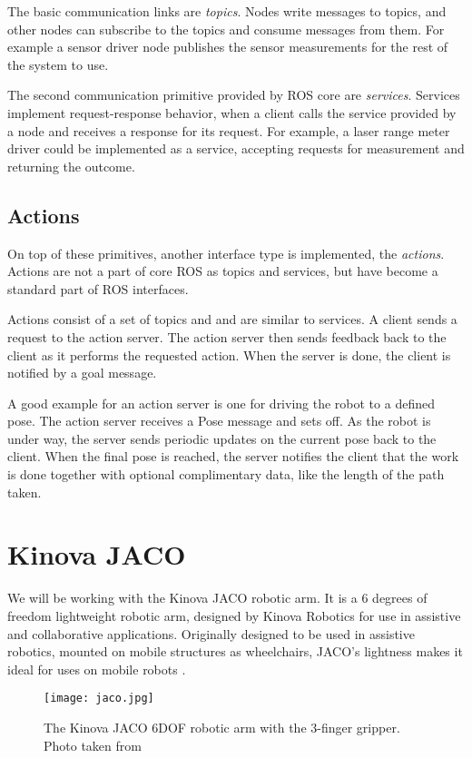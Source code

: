 \documentclass[buriama8_dp.tex]{subfiles}
\begin{document}
The basic communication links are \emph{topics}. Nodes write messages to topics, and other nodes can subscribe to the topics and consume messages from them. For example a sensor driver node publishes the sensor measurements for the rest of the system to use.

The second communication primitive provided by ROS core are \emph{services}. Services implement request-response behavior, when a client calls the service provided by a node and receives a response for its request. For example, a laser range meter driver could be implemented as a service, accepting requests for measurement and returning the outcome.

\subsection{Actions}
\label{subsec:ros_actions}

On top of these primitives, another interface type is implemented, the \emph{actions}. Actions are not a part of core ROS as topics and services, but have become a standard part of ROS interfaces.

Actions consist of a set of topics and and are similar to services. A client sends a request to the action server. The action server then sends feedback back to the client as it performs the requested action. When the server is done, the client is notified by a goal message.

A good example for an action server is one for driving the robot to a defined pose. The action server receives a Pose message and sets off. As the robot is under way, the server sends periodic updates on the current pose back to the client. When the final pose is reached, the server notifies the client that the work is done together with optional complimentary data, like the length of the path taken.


\section{Kinova JACO}
\label{sec:jaco}
We will be working with the Kinova JACO robotic arm. It is a 6 degrees of freedom lightweight robotic arm, designed by Kinova Robotics for use in assistive and collaborative applications. Originally designed to be used in assistive robotics, mounted on mobile structures as wheelchairs, JACO's lightness makes it ideal for uses on mobile robots \cite{kinova}.

\begin{figure}[ht]
  \centering
  \hspace{1cm}\texttt{[image: jaco.jpg]}
  \caption[Kinova JACO]{The Kinova JACO 6DOF robotic arm with the 3-finger gripper. Photo taken from \cite{kinova}}
  \label{fig:jaco}
\end{figure}
\end{document}
